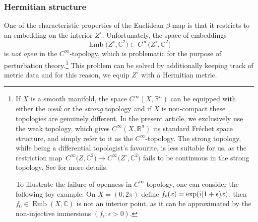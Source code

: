 \documentclass[pdftex]{sigma}
\numberwithin{equation}{section}
\theoremstyle{definition}
\newcommand{\R}{\mathbb{R}} %
\newcommand{\C}{\mathbb{C}} %
\newcommand{\1}{{\bf 1}}
\begin{document}
\subsubsection{Hermitian structure} \label{s_hermitian}
One of the characteristic properties of the Euclidean $\beta$-map
is that it restricts to an embedding on the interior $Z^\circ$. Unfortunately, the space of embeddings
\[
	\operatorname{Emb}\bigl(Z^\circ,\C^2\bigr)\subset C^\infty\bigl(Z^\circ,\C^2\bigr)
\]
is {\it not open} in the $C^\infty$-topology, which is problematic for the purpose of perturbation theory.\footnote{If $X$ is a smooth manifold, the space $C^\infty(X,\R^n)$ can be equipped with either the {\it weak} or the {\it strong} topology and if $X$ is non-compact these topologies are genuinely different. In the present article, we exclusively use the weak topology, which gives $C^\infty(X,\R^n)$ its standard Fr{\'e}chet space structure, and simply refer to it as the $C^\infty$-topology. The strong topology, while being a differential topologist's favourite, is less suitable for us, as the restriction map~${C^\infty\bigl(Z,\C^2\bigr)\rightarrow C^\infty\bigl(Z^\circ,\C^2\bigr)}$ fails to be continuous in the strong topology. See \cite[Chapter~2]{Hir76} for more details.

 To illustrate the failure of openness in $C^\infty$-topology, one can consider the following toy example: On $X=(0,2\pi)$ define $f_\epsilon(x)=\exp({\rm i}(1+\epsilon)x)$, then $f_0\in \operatorname{Emb}(X,\C)$ is not an interior point, as it can be approximated by the non-injective immersions $(f_\epsilon : \epsilon>0)$.
} This problem can be solved by additionally keeping track of metric data and for this reason, we equip $Z^\circ$ with a Hermitian metric.
\end{document}
